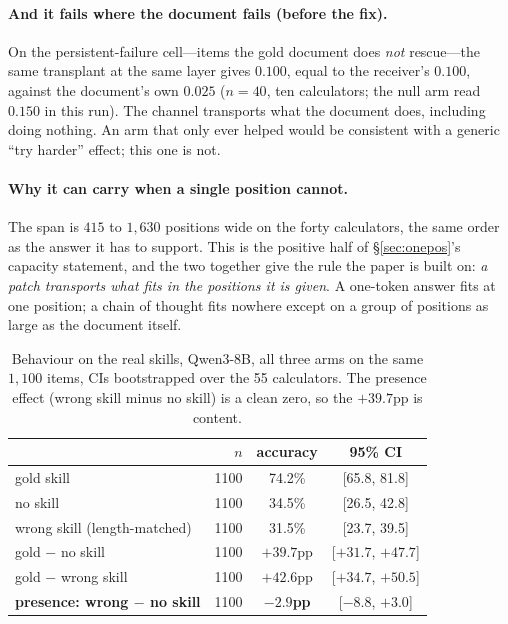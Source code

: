 \documentclass{article}
\begin{document}
\paragraph{And it fails where the document fails (before the fix).} On the
persistent-failure cell---items the gold document does \emph{not} rescue---the
same transplant at the same layer gives $0.100$, equal to the receiver's $0.100$,
against the document's own $0.025$ ($n=40$, ten calculators; the null arm read
$0.150$ in this run). The channel transports what the document does, including doing
nothing. An arm that only ever helped would be consistent with a generic ``try
harder'' effect; this one is not.

\paragraph{Why it can carry when a single position cannot.} The span is $415$ to
$1{,}630$ positions wide on the forty calculators, the same order as the answer it has to support. This is the
positive half of \S\ref{sec:onepos}'s capacity statement, and the two together
give the rule the paper is built on: \emph{a patch transports what fits in the
positions it is given}. A one-token answer fits at one position; a chain of
thought fits nowhere except on a group of positions as large as the document
itself.


\begin{table}[h]
\caption{Behaviour on the real skills, Qwen3-8B, all three arms on the same
$1{,}100$ items, CIs bootstrapped over the 55 calculators. The presence effect
(wrong skill minus no skill) is a clean zero, so the $+39.7$pp is content.}
\label{tab:behaviour}
\centering
\small
\begin{tabular}{lrcc}
\toprule
& $n$ & accuracy & 95\% CI \\
\midrule
gold skill                & 1100 & 74.2\% & [65.8, 81.8] \\
no skill                  & 1100 & 34.5\% & [26.5, 42.8] \\
wrong skill (length-matched) & 1100 & 31.5\% & [23.7, 39.5] \\
\midrule
gold $-$ no skill         & 1100 & $+39.7$pp & [$+31.7$, $+47.7$] \\
gold $-$ wrong skill      & 1100 & $+42.6$pp & [$+34.7$, $+50.5$] \\
\textbf{presence: wrong $-$ no skill} & 1100 & $\mathbf{-2.9}$\textbf{pp} & [$-8.8$, $+3.0$] \\
\bottomrule
\end{tabular}
\end{table}
\end{document}
